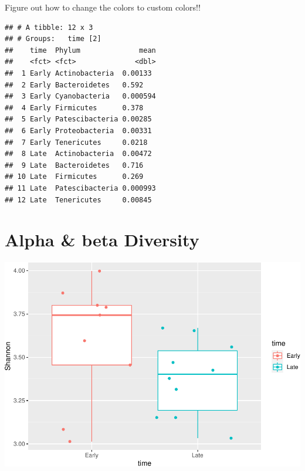 \documentclass[
]{book}
\newenvironment{Shaded}{\begin{snugshade}}{\end{snugshade}}
\newcommand{\DataTypeTok}[1]{\textcolor[rgb]{0.13,0.29,0.53}{#1}}
\newcommand{\KeywordTok}[1]{\textcolor[rgb]{0.13,0.29,0.53}{\textbf{#1}}}
\newcommand{\NormalTok}[1]{#1}
\newcommand{\OperatorTok}[1]{\textcolor[rgb]{0.81,0.36,0.00}{\textbf{#1}}}
\newcommand{\StringTok}[1]{\textcolor[rgb]{0.31,0.60,0.02}{#1}}
\begin{document}
Figure out how to change the colors to custom colors!!

\begin{Shaded}
\end{Shaded}

\begin{verbatim}
## # A tibble: 12 x 3
## # Groups:   time [2]
##    time  Phylum              mean
##    <fct> <fct>              <dbl>
##  1 Early Actinobacteria  0.00133 
##  2 Early Bacteroidetes   0.592   
##  3 Early Cyanobacteria   0.000594
##  4 Early Firmicutes      0.378   
##  5 Early Patescibacteria 0.00285 
##  6 Early Proteobacteria  0.00331 
##  7 Early Tenericutes     0.0218  
##  8 Late  Actinobacteria  0.00472 
##  9 Late  Bacteroidetes   0.716   
## 10 Late  Firmicutes      0.269   
## 11 Late  Patescibacteria 0.000993
## 12 Late  Tenericutes     0.00845
\end{verbatim}

\hypertarget{alpha-beta-diversity}{%
\section{Alpha \& beta Diversity}\label{alpha-beta-diversity}}

\includegraphics{16sworkshop_files/figure-latex/alpha diversit-1.pdf}
\end{document}
